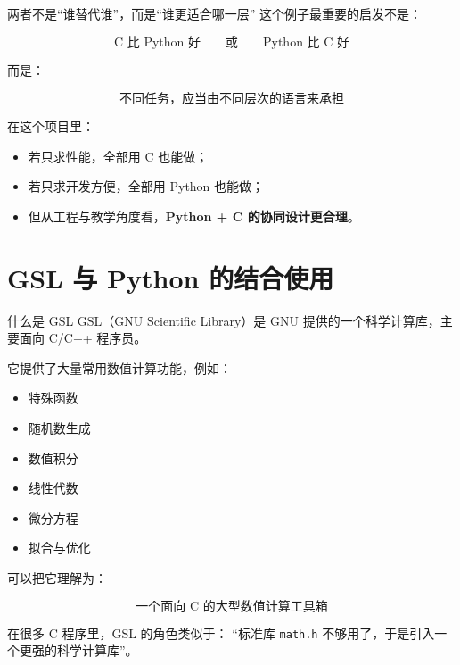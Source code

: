 \documentclass[aspectratio=169,11pt]{ctexbeamer}
\begin{document}
\begin{frame}{两者不是“谁替代谁”，而是“谁更适合哪一层”}
这个例子最重要的启发不是：

\[
\text{C 比 Python 好}
\qquad\text{或}\qquad
\text{Python 比 C 好}
\]

而是：

\[
\boxed{\text{不同任务，应当由不同层次的语言来承担}}
\]

\vspace{0.5em}
在这个项目里：

\begin{itemize}
  \item 若只求性能，全部用 C 也能做；
  \item 若只求开发方便，全部用 Python 也能做；
  \item 但从工程与教学角度看，\textbf{Python + C 的协同设计更合理}。
\end{itemize}
\end{frame}

\section{GSL 与 Python 的结合使用}

\begin{frame}{什么是 GSL}
GSL（GNU Scientific Library）是 GNU 提供的一个科学计算库，主要面向 C/C++ 程序员。

\vspace{0.5em}
它提供了大量常用数值计算功能，例如：

\begin{itemize}
  \item 特殊函数
  \item 随机数生成
  \item 数值积分
  \item 线性代数
  \item 微分方程
  \item 拟合与优化
\end{itemize}

\vspace{0.5em}
可以把它理解为：

\[
\boxed{\text{一个面向 C 的大型数值计算工具箱}}
\]

\vspace{0.5em}
在很多 C 程序里，GSL 的角色类似于：
“标准库 \texttt{math.h} 不够用了，于是引入一个更强的科学计算库”。
\end{frame}
\end{document}
